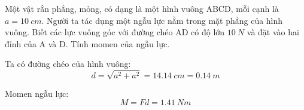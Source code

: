 \begin{enumerate}[label=\bfseries Câu \arabic*:]
	
	{Một vật rắn phẳng, mỏng, có dạng là một hình vuông ABCD, mỗi cạnh là $a=\SI{10}{cm}$. Người ta tác dụng một ngẫu lực nằm trong mặt phẳng của hình vuông. Biết các lực vuông góc với đường chéo AD có độ lớn $\SI{10}{N}$ và đặt vào hai đỉnh của A và D. Tính momen của ngẫu lực.
	}
	
	\hideall
	{Ta có đường chéo của hình vuông:
		$$d=\sqrt{a^2 + a^2} = \SI{14.14}{cm} = \SI{0.14}{m}$$
		
		Momen ngẫu lực:
		$$M=Fd = \SI{1.41}{Nm}$$
	}
\end{enumerate}
